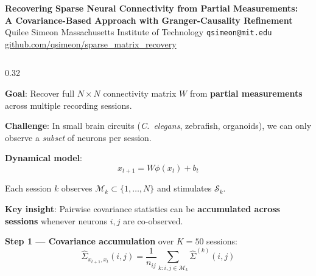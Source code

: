\documentclass[final]{beamer}
\begin{document}
\begin{frame}[t]

\vspace{-1cm}
\begin{center}
{\fontsize{52}{58}\selectfont\bfseries\color{neuripsblue}%
Recovering Sparse Neural Connectivity from Partial Measurements:\\[6pt]
A Covariance-Based Approach with Granger-Causality Refinement}\\[12pt]
{\LARGE Quilee Simeon \hspace{1cm} Massachusetts Institute of Technology \hspace{1cm} \texttt{qsimeon@mit.edu} \hspace{1cm} \url{github.com/qsimeon/sparse_matrix_recovery}}
\end{center}
\vspace{0.5cm}

\begin{columns}[T]

\begin{column}{0.32\linewidth}

\begin{tcolorbox}[posterbox,title=Problem]
\large
\textbf{Goal}: Recover full $N{\times}N$ connectivity matrix $W$ from \textbf{partial measurements} across multiple recording sessions.

\vspace{6mm}
\textbf{Challenge}: In small brain circuits (\textit{C.\ elegans}, zebrafish, organoids), we can only observe a \emph{subset} of neurons per session.

\vspace{6mm}
\textbf{Dynamical model}:
\[
  x_{t+1} = W\phi(x_t) + b_t
\]

Each session $k$ observes $\mathcal{M}_k \subset \{1,\ldots,N\}$ and stimulates $\mathcal{S}_k$.

\vspace{6mm}
\textbf{Key insight}: Pairwise covariance statistics can be \textbf{accumulated across sessions} whenever neurons $i,j$ are co-observed.
\end{tcolorbox}

\vspace{1cm}

\begin{tcolorbox}[posterbox,title=Method]
\large
\textbf{Step 1 --- Covariance accumulation} over $K{=}50$ sessions:
\[
  \hat{\Sigma}_{x_{t+1},x_t}(i,j) = \frac{1}{n_{ij}} \sum_{k: i,j\in\mathcal{M}_k} \hat{\Sigma}^{(k)}(i,j)
\]


\end{tcolorbox}
\end{column}
\end{columns}
\end{frame}
\end{document}
